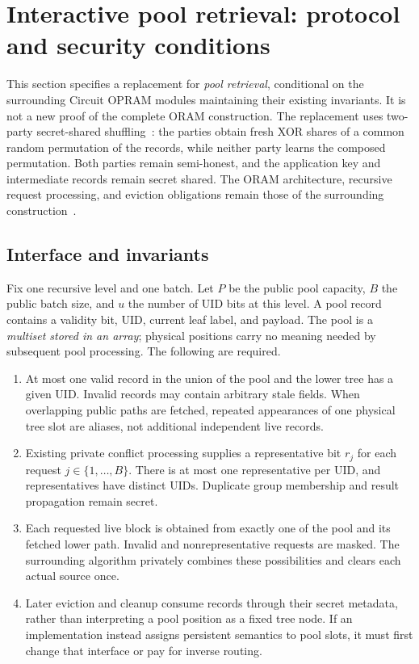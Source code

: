 \section{Interactive pool retrieval: protocol and security conditions}
\label{sec:interactive-pool-protocol}

This section specifies a replacement for \emph{pool retrieval}, conditional on
the surrounding Circuit OPRAM modules maintaining their existing invariants.
It is not a new proof of the complete ORAM construction.  The replacement uses
two-party secret-shared shuffling~\cite{cgp2020,osn2021}: the parties obtain
fresh XOR shares of a common random permutation of the records, while neither
party learns the composed permutation.  Both parties remain semi-honest, and
the application key and intermediate records remain secret shared.  The
ORAM architecture, recursive request processing, and eviction obligations
remain those of the surrounding construction~\cite{chan2017}.

\subsection{Interface and invariants}

Fix one recursive level and one batch.  Let $P$ be the public pool capacity,
$B$ the public batch size, and $u$ the number of UID bits at this level.  A
pool record contains a validity bit, UID, current leaf label, and payload.
The pool is a \emph{multiset stored in an array}; physical positions carry no
meaning needed by subsequent pool processing.  The following are required.

\begin{enumerate}
\item At most one valid record in the union of the pool and the lower tree
has a given UID.  Invalid records may contain arbitrary stale fields.  When
overlapping public paths are fetched, repeated appearances of one physical
tree slot are aliases, not additional independent live records.
\item Existing private conflict processing supplies a representative bit
$r_j$ for each request $j\in\{1,\ldots,B\}$.  There is at most one
representative per UID, and representatives have distinct UIDs.  Duplicate
group membership and result propagation remain secret.
\item Each requested live block is obtained from exactly one of the pool
and its fetched lower path.  Invalid and nonrepresentative requests are
masked.  The surrounding algorithm privately combines these possibilities
and clears each actual source once.
\item Later eviction and cleanup consume records through their secret
metadata, rather than interpreting a pool position as a fixed tree node.
If an implementation instead assigns persistent semantics to pool slots,
it must first change that interface or pay for inverse routing.
\end{enumerate}

